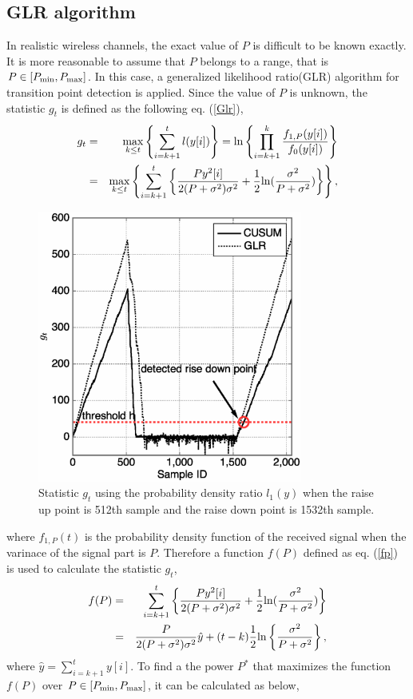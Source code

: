 \subsection{GLR algorithm}
In realistic wireless channels, the exact value of $P$ is difficult to be known exactly. It is more reasonable to assume that $P$ belongs to a range, that is $P\in[P_{{\rm min}}, P_{\rm {max}}]$. In this case, a generalized likelihood ratio(GLR) algorithm\cite{ref:GLR} for transition point detection is applied. Since the value of $P$ is unknown, the statistic $g_t$ is defined as the following eq. (\ref{Glr}),
\begin{eqnarray}
g_t &=& \max_{k \leq t}\left\{ \sum_{i=k+1}^tl(y[i])\right\}={\rm ln}\left\{\prod_{i=k+1}^k\frac{f_{1,P}(y[i])}{f_0(y[i])}\right\} \nonumber \\ 
   &=& \max_{k \leq t}\left\{\sum_{i=k+1}^t\left\{ \frac{Py^2[i]}{2(P+\sigma^2)\sigma^2}+\frac{1}{2} {\rm ln}(\frac{\sigma^2}{P+\sigma^2}) \right\}\right\},
\label{Glr}
\end{eqnarray}
\begin{figure}[t]
\centering
\includegraphics[width=87mm]{ON2OFF.eps}
\caption{Statistic $g_t$ using the probability density ratio $l_1(y)$ when the raise up point is 512th sample and the raise down point is 1532th sample.}
\label{ON2OFF}
\end{figure}
where $f_{1,P}(t)$ is the probability density function of the received signal when the varinace of the signal part is $P$. Therefore a function $f(P)$ defined as eq. (\ref{fp}) is used to calculate the statistic $g_t$,
\begin{eqnarray}
f(P) &=& \sum_{i=k+1}^t\left\{ \frac{Py^2[i]}{2(P+\sigma^2)\sigma^2}+\frac{1}{2} {\rm ln}(\frac{\sigma^2}{P+\sigma^2})\right\} \nonumber\\ 
&=&\frac{P}{2(P+\sigma^2)\sigma^2}\hat{y}+(t-k)\frac{1}{2}{\rm ln}\left\{ \frac{\sigma^2}{P+\sigma^2} \right\},
\label{fp}
\end{eqnarray}
where $\hat{y}=\sum_{i=k+1}^t y[i]$. To find a the power $P^{*}$ that maximizes the function $f(P)$ over $P \in [P_{{\rm min}}, P_{{\rm max}}]$, it can be calculated as below,

